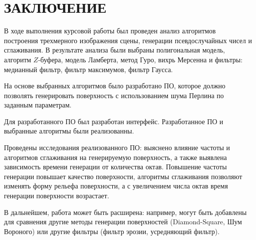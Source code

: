 \chapter*{\hfill{\centering ЗАКЛЮЧЕНИЕ}\hfill}

В ходе выполнения курсовой работы был проведен анализ алгоритмов построения трехмерного изображения сцены, генерации псевдослучайных чисел и сглаживания. В результате анализа были выбраны полигональная модель, алгоритм $Z$-буфера, модель Ламберта, метод Гуро, вихрь Мерсенна и фильтры: медианный фильтр, фильтр максимумов, фильтр Гаусса.

На основе выбранных алгоритмов было разработано ПО, которое должно позволять генерировать поверхность с использованием шума Перлина по заданным параметрам.

Для разработанного ПО был разработан интерфейс.
Разработанное ПО и выбранные алгоритмы были реализованны.

Проведены исследования реализованного ПО: выяснено влияние частоты и алгоритмов сглаживания на генерируемую поверхность, а также выявлена зависимость времени генерации от количества октав. Повышение частоты генерации повышает качество поверхности, алгоритмы сглаживания позволяют изменять форму рельефа поверхности, а с увеличением числа октав время генерации поверхности возрастает.

В дальнейшем, работа может быть расширена: например, могут быть добавлены для сравнения другие методы генерации поверхностей (Diamond-Square, Шум Вороного) или другие фильтры (фильтр эрозии, усредняющий фильтр).